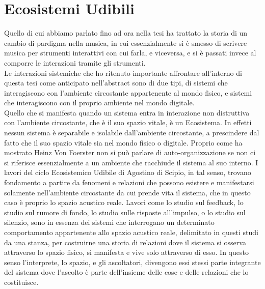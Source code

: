 \section{Ecosistemi Udibili}
\label{sec:Ecosistemi Udibili}

Quello di cui abbiamo parlato fino ad ora nella tesi ha trattato la storia di 
un cambio di pardigma nella musica, in cui essenzialmente si è smesso di 
scrivere musica per strumenti interattivi con cui farla, e viceversa, 
e  si è passati invece al  comporre le interazioni tramite gli strumenti. \\
Le interazioni sistemiche che ho ritenuto importante affrontare all'interno di questa tesi 
come anticipato nell'abstract sono di due tipi, 
di sistemi che interagiscono con l’ambiente circostante appartenente al mondo fisico, 
e sistemi che interagiscono con il proprio ambiente nel mondo digitale. \\
Quello che si manifesta quando un sistema entra in interazione non distruttiva 
con l'ambiente circostante, che è il suo spazio vitale,  è un Ecosistema. 
In effetti nessun sistema è separabile e isolabile dall'ambiente circostante, 
a prescindere dal fatto che il suo spazio vitale sia nel mondo fisico o digitale. 
Proprio come ha mostrato Heinz Von Foerster non si può parlare di auto-organizzazione 
se non ci si riferisce essenzialmente a un ambiente che racchiude il sistema al suo interno. 
I lavori del ciclo Ecosistemico Udibile di Agostino di Scipio, in tal senso, 
trovano fondamento a partire da fenomeni e relazioni che possono esistere e manifestarsi solamente nell'ambiente 
circostante da cui prende vita il sistema, che in questo caso è proprio lo spazio acustico reale. 
Lavori come lo studio sul feedback, lo studio sul rumore di fondo, lo studio sulle risposte all'impulso, o
lo studio sul silenzio, sono in essenza dei sistemi che interrogano un determinato 
comportamento appartenente allo spazio acustico reale, delimitato in questi studi da una stanza,
per costruirne una storia di relazioni dove il sistema si osserva attraverso lo spazio fisico, 
si manifesta e vive solo attraverso di esso.
In questo senso l’interprete, lo spazio, e gli ascoltatori, 
divengono essi stessi parte integrante del sistema dove l’ascolto è 
parte dell’insieme delle cose e delle relazioni che lo costituisce. \\

